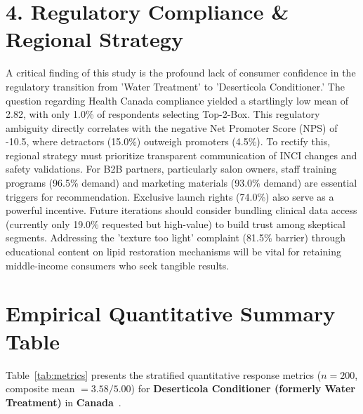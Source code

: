 \documentclass[10pt,twocolumn,a4paper]{article}
\begin{document}
\section{4. Regulatory Compliance \& Regional Strategy}
A critical finding of this study is the profound lack of consumer confidence in the regulatory transition from 'Water Treatment' to 'Deserticola Conditioner.' The question regarding Health Canada compliance yielded a startlingly low mean of 2.82, with only 1.0\% of respondents selecting Top-2-Box. This regulatory ambiguity directly correlates with the negative Net Promoter Score (NPS) of -10.5, where detractors (15.0\%) outweigh promoters (4.5\%). To rectify this, regional strategy must prioritize transparent communication of INCI changes and safety validations. For B2B partners, particularly salon owners, staff training programs (96.5\% demand) and marketing materials (93.0\% demand) are essential triggers for recommendation. Exclusive launch rights (74.0\%) also serve as a powerful incentive. Future iterations should consider bundling clinical data access (currently only 19.0\% requested but high-value) to build trust among skeptical segments. Addressing the 'texture too light' complaint (81.5\% barrier) through educational content on lipid restoration mechanisms will be vital for retaining middle-income consumers who seek tangible results.


\section{Empirical Quantitative Summary Table}
Table~\ref{tab:metrics} presents the stratified quantitative response metrics ($n = 200$, composite mean $= 3.58/5.00$) for \textbf{Deserticola Conditioner (formerly Water Treatment)} in \textbf{Canada}~\cite{ref_kaggle_doi,ref_hf_doi}.
\end{document}
